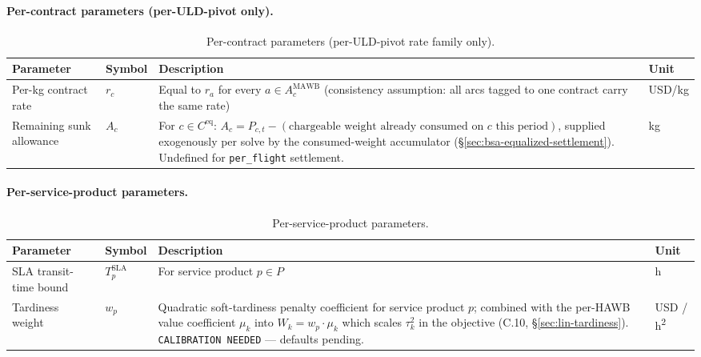 \documentclass[11pt,a4paper]{article}
\theoremstyle{definition}
\begin{document}
\paragraph{Per-contract parameters (per-ULD-pivot only).}
\begin{table}[H]
\centering
\caption{Per-contract parameters (per-ULD-pivot rate family only).}
\label{tab:per-contract-params}
\begin{tabular}{p{2.8cm}p{2.5cm}p{7cm}p{1.5cm}}
\toprule
Parameter & Symbol & Description & Unit \\
\midrule
Per-kg contract rate & $r_c$ & Equal to $r_a$ for every $a \in A_c^{\text{MAWB}}$ (consistency assumption: all arcs tagged to one contract carry the same rate) & USD/kg \\
Remaining sunk allowance & $A_c$ & For $c \in C^{\text{eq}}$: $A_c = P_{c,t} - (\text{chargeable weight already consumed on $c$ this period})$, supplied exogenously per solve by the consumed-weight accumulator (\S\ref{sec:bsa-equalized-settlement}). Undefined for \texttt{per\_flight} settlement. & kg \\
\bottomrule
\end{tabular}
\end{table}

\paragraph{Per-service-product parameters.}
\begin{table}[H]
\centering
\caption{Per-service-product parameters.}
\label{tab:service-product-params}
\begin{tabular}{p{2.8cm}p{2.5cm}p{7cm}p{1.5cm}}
\toprule
Parameter & Symbol & Description & Unit \\
\midrule
SLA transit-time bound & $T^{\text{SLA}}_p$ & For service product $p \in P$ & h \\
Tardiness weight & $w_p$ & Quadratic soft-tardiness penalty coefficient for service product $p$; combined with the per-HAWB value coefficient $\mu_k$ into $W_k = w_p \cdot \mu_k$ which scales $\tau_k^2$ in the objective (C.10, \S\ref{sec:lin-tardiness}). \texttt{CALIBRATION NEEDED} --- defaults pending. & USD / h\textsuperscript{2} \\
\bottomrule
\end{tabular}
\end{table}
\end{document}

